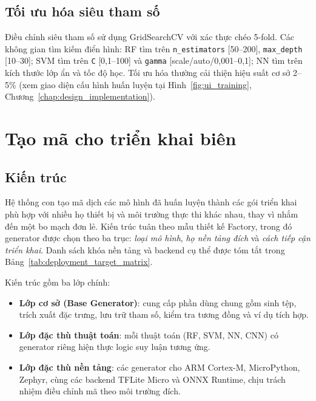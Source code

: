 \subsection{Tối ưu hóa siêu tham số}
Điều chỉnh siêu tham số sử dụng GridSearchCV với xác thực chéo 5-fold. Các không gian tìm kiếm điển hình: RF tìm trên \texttt{n\_estimators} [50--200], \texttt{max\_depth} [10--30]; SVM tìm trên \texttt{C} [0,1--100] và \texttt{gamma} [scale/auto/0,001--0,1]; NN tìm trên kích thước lớp ẩn và tốc độ học. Tối ưu hóa thường cải thiện hiệu suất cơ sở 2--5\% (xem giao diện cấu hình huấn luyện tại Hình~\ref{fig:ui_training}, Chương~\ref{chap:design_implementation}).

\section{Tạo mã cho triển khai biên}

\subsection{Kiến trúc}
Hệ thống con tạo mã dịch các mô hình đã huấn luyện thành các gói triển khai phù hợp với nhiều họ thiết bị và môi trường thực thi khác nhau, thay vì nhắm đến một bo mạch đơn lẻ. Kiến trúc tuân theo mẫu thiết kế Factory, trong đó generator được chọn theo ba trục: \textit{loại mô hình}, \textit{họ nền tảng đích} và \textit{cách tiếp cận triển khai}. Danh sách khóa nền tảng và backend cụ thể được tóm tắt trong Bảng~\ref{tab:deployment_target_matrix}.

Kiến trúc gồm ba lớp chính:
\begin{itemize}
    \item \textbf{Lớp cơ sở (Base Generator)}: cung cấp phần dùng chung gồm sinh tệp, trích xuất đặc trưng, lưu trữ tham số, kiểm tra tương đồng và ví dụ tích hợp.
    \item \textbf{Lớp đặc thù thuật toán}: mỗi thuật toán (RF, SVM, NN, CNN) có generator riêng hiện thực logic suy luận tương ứng.
    \item \textbf{Lớp đặc thù nền tảng}: các generator cho ARM Cortex-M, MicroPython, Zephyr, cùng các backend TFLite Micro và ONNX Runtime, chịu trách nhiệm điều chỉnh mã theo môi trường đích.
\end{itemize}

